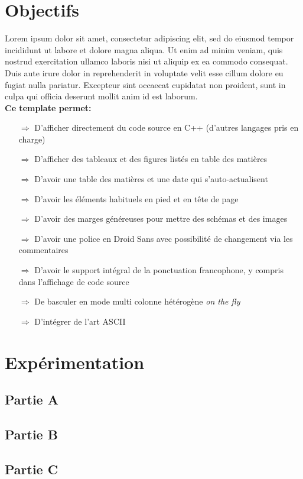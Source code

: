 \section{Objectifs}
Lorem ipsum dolor sit amet, consectetur adipiscing elit, sed do eiusmod tempor incididunt ut labore et dolore magna aliqua. Ut enim ad minim veniam, quis nostrud exercitation ullamco laboris nisi ut aliquip ex ea commodo consequat. Duis aute irure dolor in reprehenderit in voluptate velit esse cillum dolore eu fugiat nulla pariatur. Excepteur sint occaecat cupidatat non proident, sunt in culpa qui officia deserunt mollit anim id est laborum.\\

\textbf{Ce template permet:}
\begin{itemize}
\item[$\Rightarrow$]D'afficher directement du code source en C++ (d'autres langages pris en charge)
\item[$\Rightarrow$]D'afficher des tableaux et des figures listés en table des matières
\item[$\Rightarrow$]D'avoir une table des matières et une date qui s'auto-actualisent
\item[$\Rightarrow$]D'avoir les éléments habituels en pied et en tête de page
\item[$\Rightarrow$]D'avoir des marges généreuses pour mettre des schémas et des images
\item[$\Rightarrow$]D'avoir une police en Droid Sans avec possibilité de changement via les commentaires
\item[$\Rightarrow$]D'avoir le support intégral de la ponctuation francophone, y compris dans l'affichage de code source
\item[$\Rightarrow$]De basculer en mode multi colonne hétérogène \textit{on the fly}
\item[$\Rightarrow$]D'intégrer de l'art ASCII
\end{itemize}

\section{Expérimentation}
\subsection{Partie A}
\subsection{Partie B}
\subsection{Partie C}
